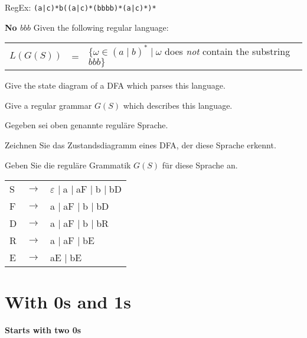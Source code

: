 \documentclass[a4paper]{exam}
\theoremstyle{remark}
\newenvironment{grammar}
	{\begin{tabular}[b]{lcl}}
	{\end{tabular}}
\newcommand{\rewritten}{$\to$}
\newcommand{\alternative}{$\mid \;$}
\begin{document}
\begin{questions}
\begin{solution}
	RegEx: {\tt (a|c)*b((a|c)*(bbbb)*(a|c)*)*}
	
	\end{solution}

\question \textbf{No $bbb$}
	Given the following regular language:
	
	\begin{tabular}[b]{lcl}
		$L(G(S))$ & = & $\{\omega \in (a \mid b)^* \mid \omega$ does {\em not} contain the substring $bbb\}$
	\end{tabular}

	\begin{parts}
		\item Give the state diagram of a DFA which parses this language.

		\item Give a regular grammar $G(S)$ which describes this language.
		
	\end{parts}
	
	\begin{otherlanguage}{german}
		Gegeben sei oben genannte reguläre Sprache.
		
		\begin{parts}
		\item Zeichnen Sie das Zustandsdiagramm eines DFA, der diese Sprache erkennt.

		\item Geben Sie die reguläre Grammatik $G(S)$ für diese Sprache an.
		
	\end{parts}

	\end{otherlanguage}

	\begin{solution}
		
		\begin{grammar}
			S & \rewritten & $\varepsilon$ \alternative a \alternative aF \alternative b \alternative bD \\
			F & \rewritten & a \alternative aF \alternative b \alternative bD \\
			D & \rewritten & a \alternative aF \alternative b \alternative bR \\
			R & \rewritten & a \alternative aF \alternative bE \\
			E & \rewritten & aE \alternative bE
		\end{grammar}
		
	\end{solution}

	\section{With 0s and 1s}
\question
	\textbf{Starts with two 0s}


\end{questions}
\end{document}
